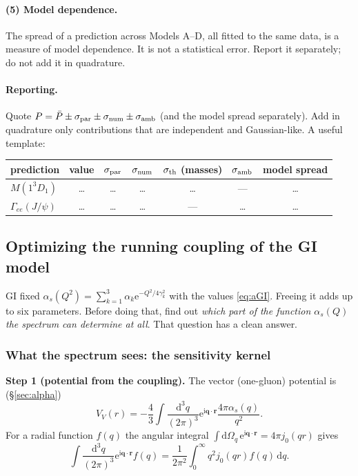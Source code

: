 \documentclass[11pt,a4paper]{article}
\numberwithin{equation}{section}
\theoremstyle{definition}
\theoremstyle{plain}
\theoremstyle{remark}
\numberwithin{algorithm}{section}
\newcommand{\vr}{\bm r}
\newcommand{\vq}{\bm q}
\newcommand{\as}{\alpha_s}
\newcommand{\dd}{\mathrm{d}}
\newcommand{\ii}{\mathrm{i}}
\newcommand{\ee}{\mathrm{e}}
\begin{document}
\paragraph{(5) Model dependence.} The spread of a prediction across Models A--D, all fitted to the same data, is a measure of model dependence. It is not a statistical error. Report it separately; do not add it in quadrature.

\paragraph{Reporting.} Quote $P=\bar P\pm\sigma_{\rm par}\pm\sigma_{\rm num}\pm\sigma_{\rm amb}$ (and the model spread separately). Add in quadrature only contributions that are independent and Gaussian-like. A useful template:
\begin{center}\small
\begin{tabular}{@{}lcccccc@{}}\toprule
prediction & value & $\sigma_{\rm par}$ & $\sigma_{\rm num}$ & $\sigma_{\rm th}$ (masses) & $\sigma_{\rm amb}$ & model spread\\\midrule
$M(1^3D_1)$ & \dots & \dots & \dots & \dots & --- & \dots\\
$\Gamma_{ee}(J/\psi)$ & \dots & \dots & \dots & --- & \dots & \dots\\\bottomrule
\end{tabular}
\end{center}
\subsection{Optimizing the running coupling of the GI model}\label{sec:alphafit}
GI fixed $\as(Q^2)=\sum_{k=1}^3\alpha_k\ee^{-Q^2/4\gamma_k^2}$ with the values \eqref{eq:aGI}. Freeing it adds up to six parameters. Before doing that, find out \emph{which part of the function $\as(Q)$ the spectrum can determine at all}. That question has a clean answer.

\subsubsection{What the spectrum sees: the sensitivity kernel}
\textbf{Step 1 (potential from the coupling).} The vector (one-gluon) potential is (\S\ref{sec:alpha})
\[
V_V(r)=-\frac43\int\frac{\dd^3q}{(2\pi)^3}\ee^{\ii\vq\cdot\vr}\frac{4\pi\as(q)}{q^2}.
\]
For a radial function $f(q)$ the angular integral $\int\dd\Omega_q\,\ee^{\ii\vq\cdot\vr}=4\pi j_0(qr)$ gives
\[
\int\frac{\dd^3q}{(2\pi)^3}\ee^{\ii\vq\cdot\vr}f(q)=\frac1{2\pi^2}\int_0^\infty q^2j_0(qr)f(q)\,\dd q .
\]
\end{document}
